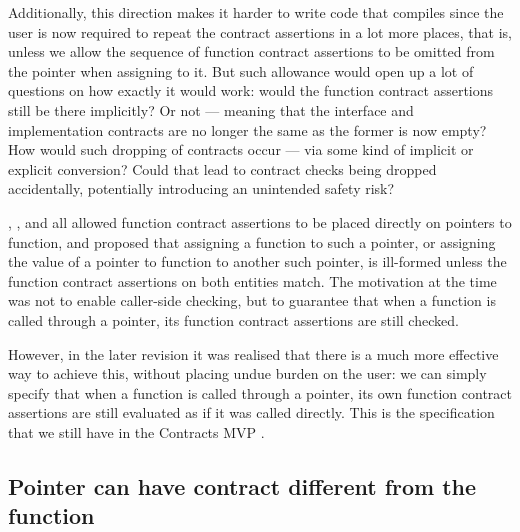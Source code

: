 Additionally, this direction makes it harder to write code that compiles since the user is now required to repeat the contract assertions in a lot more places, that is, unless we allow the sequence of function contract assertions to be omitted from the pointer when assigning to it. But such allowance would open up a lot of questions on how exactly it would work: would the function contract assertions still be there implicitly? Or not --- meaning that the interface and implementation contracts are no longer the same as the former is now empty? How would such dropping of contracts occur --- via some kind of implicit or explicit conversion? Could that lead to contract checks being dropped accidentally, potentially introducing an unintended safety risk?

\cite{N4415}, \cite{P0287R0}, and \cite{P0380R0} all allowed function contract assertions to be placed directly on pointers to function, and proposed that assigning a function to such a pointer, or assigning the value of a pointer to function to another such pointer, is ill-formed unless the function contract assertions on both entities match. The motivation at the time was not to enable caller-side checking, but to guarantee that when a function is called through a pointer, its function contract assertions are still checked.

However, in the later revision \cite{P0380R1} it was realised that there is a much more effective way to achieve this, without placing undue burden on the user: we can simply specify that when a function is called through a pointer, its own function contract assertions are still evaluated as if it was called directly. This is the specification that we still have in the Contracts MVP \cite{P2900R7}.

\subsection{Pointer can have contract different from the function}

